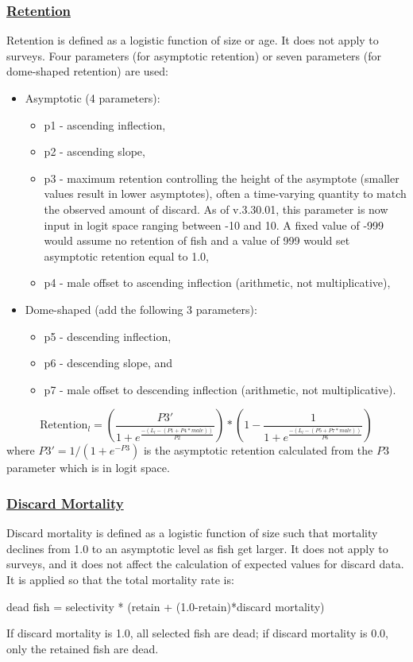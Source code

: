 \subsubsection[Retention]{\protect\hyperlink{Retention}{Retention}}
Retention is defined as a logistic function of size or age. It does not apply to surveys. Four parameters (for asymptotic retention) or seven parameters (for dome-shaped retention) are used:
\begin{itemize}
	\item Asymptotic (4 parameters):
	\begin{itemize}
		\item p1 - ascending inflection,
		\item p2 - ascending slope,
		\item p3 - maximum retention controlling the height of the asymptote (smaller values result in lower asymptotes), often a time-varying quantity to match the observed amount of discard. As of v.3.30.01, this parameter is now input in logit space ranging between -10 and 10. A fixed value of -999 would assume no retention of fish and a value of 999 would set asymptotic retention equal to 1.0,
		\item p4 - male offset to ascending inflection (arithmetic, not multiplicative),
	\end{itemize}
	\item Dome-shaped (add the following 3 parameters):
	\begin{itemize}
		\item p5 - descending inflection,
		\item p6 - descending slope, and
		\item p7 - male offset to descending inflection (arithmetic, not multiplicative).
	\end{itemize}
\end{itemize}

\begin{equation}
	\text{Retention}_l = \left(\frac{P3'}{1 + e^{\frac{-(L_l-(P1+P4*male))}{P2}}}\right)*\left(1 - \frac{1}{1 + e^{\frac{-(L_l-(P5+P7*male))}{P6}}}\right)
\end{equation}
where $P3' = 1/(1+e^{-P3})$ is the asymptotic retention calculated from the $P3$ parameter which is in logit space.

\hypertarget{DiscardM}{}
\subsubsection[Discard Mortality]{\protect\hyperlink{DiscardM}{Discard Mortality}}
Discard mortality is defined as a logistic function of size such that mortality declines from 1.0 to an asymptotic level as fish get larger. It does not apply to surveys, and it does not affect the calculation of expected values for discard data. It is applied so that the total mortality rate is:
\begin{center}
	dead fish = selectivity * (retain + (1.0-retain)*discard mortality)
\end{center}
If discard mortality is 1.0, all selected fish are dead; if discard mortality is 0.0, only the retained fish are dead.

